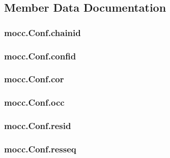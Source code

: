 \subsection{Member Data Documentation}
\hypertarget{classmocc_1_1_conf_a4d4f705ae22c4a96a17a63cfa5dbc51d}{
\subsubsection[{chainid}]{\setlength{\rightskip}{0pt plus 5cm}mocc.\-Conf.\-chainid}}\label{classmocc_1_1_conf_a4d4f705ae22c4a96a17a63cfa5dbc51d}
\hypertarget{classmocc_1_1_conf_aca1ad7dd1cbd3016b49d0324cd215a6c}{
\subsubsection[{confid}]{\setlength{\rightskip}{0pt plus 5cm}mocc.\-Conf.\-confid}}\label{classmocc_1_1_conf_aca1ad7dd1cbd3016b49d0324cd215a6c}
\hypertarget{classmocc_1_1_conf_abe64fbfee389298b7ab826e203c3684b}{
\subsubsection[{cor}]{\setlength{\rightskip}{0pt plus 5cm}mocc.\-Conf.\-cor}}\label{classmocc_1_1_conf_abe64fbfee389298b7ab826e203c3684b}
\hypertarget{classmocc_1_1_conf_a502e54dae7949b03753996d86fa00ec3}{
\subsubsection[{occ}]{\setlength{\rightskip}{0pt plus 5cm}mocc.\-Conf.\-occ}}\label{classmocc_1_1_conf_a502e54dae7949b03753996d86fa00ec3}
\hypertarget{classmocc_1_1_conf_afb6520f03e8170fa7f13806ad6960b1e}{
\subsubsection[{resid}]{\setlength{\rightskip}{0pt plus 5cm}mocc.\-Conf.\-resid}}\label{classmocc_1_1_conf_afb6520f03e8170fa7f13806ad6960b1e}
\hypertarget{classmocc_1_1_conf_a9b80e40b5c8f4ee88bb5c3c0e8864055}{
\subsubsection[{resseq}]{\setlength{\rightskip}{0pt plus 5cm}mocc.\-Conf.\-resseq}}\label{classmocc_1_1_conf_a9b80e40b5c8f4ee88bb5c3c0e8864055}
